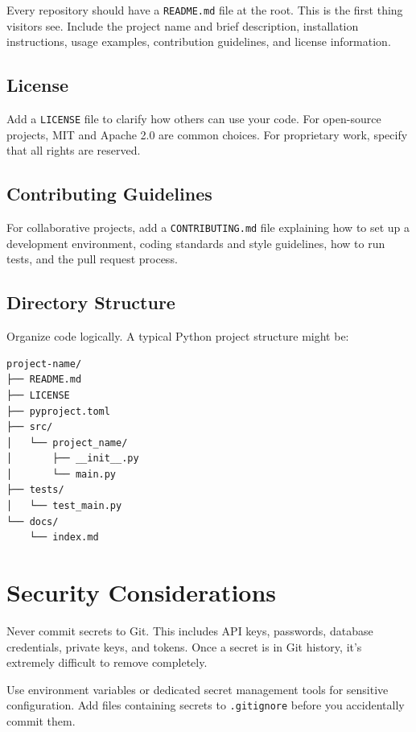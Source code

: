 \documentclass[
  letterpaper,
  DIV=11,
  numbers=noendperiod]{scrreprt}
\begin{document}
Every repository should have a \texttt{README.md} file at the root. This
is the first thing visitors see. Include the project name and brief
description, installation instructions, usage examples, contribution
guidelines, and license information.

\subsection{License}\label{license-1}

Add a \texttt{LICENSE} file to clarify how others can use your code. For
open-source projects, MIT and Apache 2.0 are common choices. For
proprietary work, specify that all rights are reserved.

\subsection{Contributing Guidelines}\label{contributing-guidelines}

For collaborative projects, add a \texttt{CONTRIBUTING.md} file
explaining how to set up a development environment, coding standards and
style guidelines, how to run tests, and the pull request process.

\subsection{Directory Structure}\label{directory-structure}

Organize code logically. A typical Python project structure might be:

\begin{verbatim}
project-name/
├── README.md
├── LICENSE
├── pyproject.toml
├── src/
│   └── project_name/
│       ├── __init__.py
│       └── main.py
├── tests/
│   └── test_main.py
└── docs/
    └── index.md
\end{verbatim}

\section{Security Considerations}\label{security-considerations}

Never commit secrets to Git. This includes API keys, passwords, database
credentials, private keys, and tokens. Once a secret is in Git history,
it's extremely difficult to remove completely.

Use environment variables or dedicated secret management tools for
sensitive configuration. Add files containing secrets to
\texttt{.gitignore} before you accidentally commit them.
\end{document}
